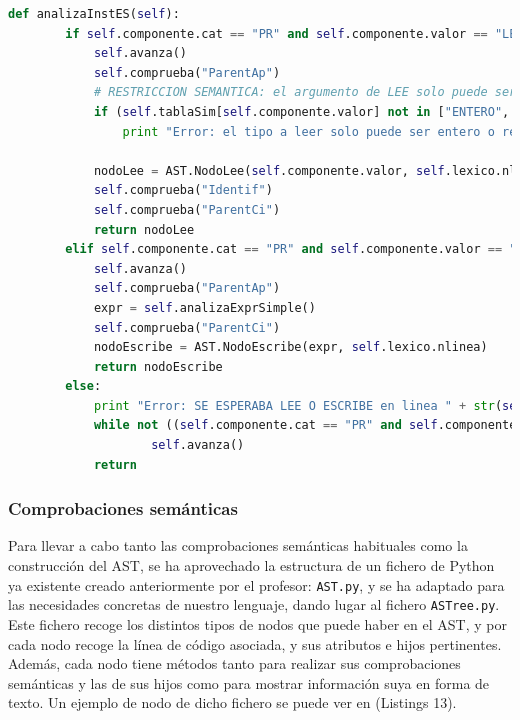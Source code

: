 \documentclass[11pt]{article}
\begin{document}
\begin{minipage}{\linewidth}
    \begin{lstlisting}[language=Python, caption=analizaInstES()]          
    def analizaInstES(self):
        if self.componente.cat == "PR" and self.componente.valor == "LEE":
            self.avanza()
            self.comprueba("ParentAp")
            # RESTRICCION SEMANTICA: el argumento de LEE solo puede ser entero o real
            if (self.tablaSim[self.componente.valor] not in ["ENTERO", "REAL"]):
                print "Error: el tipo a leer solo puede ser entero o real (instruccion LEE en linea " + str(self.componente.linea) + ")"

            nodoLee = AST.NodoLee(self.componente.valor, self.lexico.nlinea)
            self.comprueba("Identif")
            self.comprueba("ParentCi")
            return nodoLee
        elif self.componente.cat == "PR" and self.componente.valor == "ESCRIBE":
            self.avanza()
            self.comprueba("ParentAp")
            expr = self.analizaExprSimple()
            self.comprueba("ParentCi")
            nodoEscribe = AST.NodoEscribe(expr, self.lexico.nlinea)
            return nodoEscribe
        else: 
            print "Error: SE ESPERABA LEE O ESCRIBE en linea " + str(self.lexico.nlinea)
            while not ((self.componente.cat == "PR" and self.componente.valor == "SINO") or self.componente.cat == "PtoComa"):
                    self.avanza()
            return
	\end{lstlisting}
\end{minipage}

\subsubsection{Comprobaciones semánticas}
Para llevar a cabo tanto las comprobaciones semánticas habituales como la construcción del AST, se ha aprovechado la estructura de un fichero de Python ya existente creado anteriormente por el profesor: \lstinline[language=Python]{AST.py}, y se ha adaptado para las necesidades concretas de nuestro lenguaje, dando lugar al fichero \lstinline[language=Python]{ASTree.py}. Este fichero recoge los distintos tipos de nodos que puede haber en el AST, y por cada nodo recoge la línea de código asociada, y sus atributos e hijos pertinentes. Además, cada nodo tiene métodos tanto para realizar sus comprobaciones semánticas y las de sus hijos como para mostrar información suya en forma de texto. Un ejemplo de nodo de dicho fichero se puede ver en (Listings 13).
\end{document}
